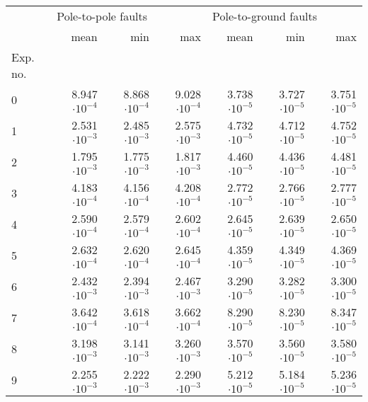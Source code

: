 \begin{tabular}{lrrrrrr}
\toprule
{} & \multicolumn{3}{l}{Pole-to-pole faults} & \multicolumn{3}{l}{Pole-to-ground faults} \\
{} &                mean &       min &       max &                  mean &       min &       max \\
Exp. no. &                     &           &           &                       &           &           \\
\midrule
0        &           8.947$\cdot10^{-4}$ & 8.868$\cdot10^{-4}$ & 9.028$\cdot10^{-4}$ &             3.738$\cdot10^{-5}$ & 3.727$\cdot10^{-5}$ & 3.751$\cdot10^{-5}$ \\
1        &           2.531$\cdot10^{-3}$ & 2.485$\cdot10^{-3}$ & 2.575$\cdot10^{-3}$ &             4.732$\cdot10^{-5}$ & 4.712$\cdot10^{-5}$ & 4.752$\cdot10^{-5}$ \\
2        &           1.795$\cdot10^{-3}$ & 1.775$\cdot10^{-3}$ & 1.817$\cdot10^{-3}$ &             4.460$\cdot10^{-5}$ & 4.436$\cdot10^{-5}$ & 4.481$\cdot10^{-5}$ \\
3        &           4.183$\cdot10^{-4}$ & 4.156$\cdot10^{-4}$ & 4.208$\cdot10^{-4}$ &             2.772$\cdot10^{-5}$ & 2.766$\cdot10^{-5}$ & 2.777$\cdot10^{-5}$ \\
4        &           2.590$\cdot10^{-4}$ & 2.579$\cdot10^{-4}$ & 2.602$\cdot10^{-4}$ &             2.645$\cdot10^{-5}$ & 2.639$\cdot10^{-5}$ & 2.650$\cdot10^{-5}$ \\
5        &           2.632$\cdot10^{-4}$ & 2.620$\cdot10^{-4}$ & 2.645$\cdot10^{-4}$ &             4.359$\cdot10^{-5}$ & 4.349$\cdot10^{-5}$ & 4.369$\cdot10^{-5}$ \\
6        &           2.432$\cdot10^{-3}$ & 2.394$\cdot10^{-3}$ & 2.467$\cdot10^{-3}$ &             3.290$\cdot10^{-5}$ & 3.282$\cdot10^{-5}$ & 3.300$\cdot10^{-5}$ \\
7        &           3.642$\cdot10^{-4}$ & 3.618$\cdot10^{-4}$ & 3.662$\cdot10^{-4}$ &             8.290$\cdot10^{-5}$ & 8.230$\cdot10^{-5}$ & 8.347$\cdot10^{-5}$ \\
8        &           3.198$\cdot10^{-3}$ & 3.141$\cdot10^{-3}$ & 3.260$\cdot10^{-3}$ &             3.570$\cdot10^{-5}$ & 3.560$\cdot10^{-5}$ & 3.580$\cdot10^{-5}$ \\
9        &           2.255$\cdot10^{-3}$ & 2.222$\cdot10^{-3}$ & 2.290$\cdot10^{-3}$ &             5.212$\cdot10^{-5}$ & 5.184$\cdot10^{-5}$ & 5.236$\cdot10^{-5}$ \\
\bottomrule
\end{tabular}

